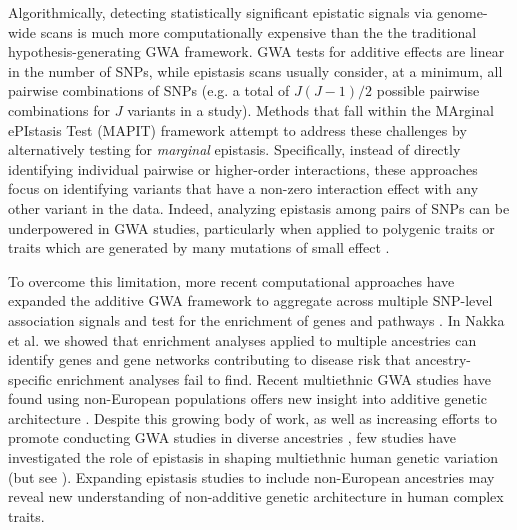 \documentclass[10pt]{article}
\begin{document}
Algorithmically, detecting statistically significant epistatic signals via genome-wide scans is much more computationally expensive than the the traditional hypothesis-generating GWA framework. GWA tests for additive effects are linear in the number of SNPs, while epistasis scans usually consider, at a minimum, all pairwise combinations of SNPs (e.g. a total of $J(J - 1)/2$ possible pairwise combinations for $J$ variants in a study). Methods that fall within the MArginal ePIstasis Test (MAPIT) framework \cite{Crawford2017a,Crawford2018b,Moore2019,Wang2019} attempt to address these challenges by alternatively testing for \textit{marginal} epistasis. Specifically, instead of directly identifying individual pairwise or higher-order interactions, these approaches focus on identifying variants that have a non-zero interaction effect with any other variant in the data. Indeed, analyzing epistasis among pairs of SNPs can be underpowered in GWA studies, particularly when applied to polygenic traits or traits which are generated by many mutations of small effect \cite{Zhou2013,Yang2014,Bulik-Sullivan2015,Wray2018}. 

To overcome this limitation, more recent computational approaches have expanded the additive GWA framework to aggregate across multiple SNP-level association signals and test for the enrichment of genes and pathways \cite{Subramanian2005,Cantor2010,Wang2010b,Lee2012,Carbonetto2013,Mooney2014,Gamazon2015,de2016,Nakka2016,Zhu2018,Sun2019,Cheng2020}. In Nakka et al. \cite{Nakka2017} we showed that enrichment analyses applied to multiple ancestries can identify genes and gene networks contributing to disease risk that ancestry-specific enrichment analyses fail to find. Recent multiethnic GWA studies have found using non-European populations offers new insight into additive genetic architecture \cite{Martin2017b,Crawford2017b,Duncan2019,Kuchenbaecker2019,Zhong2019,Wojcik2019,Chen2020,Marnetto2020}. Despite this growing body of work, as well as increasing efforts to promote conducting GWA studies in diverse ancestries \cite{Popejoy2016,Martin2018,Martin2019,Gurdasani2019,Sirugo2019,Wojcik2019}, few studies have investigated the role of epistasis in shaping multiethnic human genetic variation (but see \cite{Ma2012,Fish2016,Choquet2018,Hoffmann2018}). Expanding epistasis studies to include non-European ancestries may reveal new understanding of non-additive genetic architecture in human complex traits. 
\end{document}
